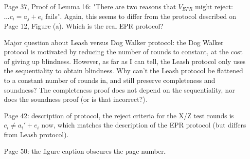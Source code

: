 \documentclass[12pt]{article}
\begin{document}
Page 37, Proof of Lemma 16: "There are two reasons that $V_{EPR}$ might reject: $... c_i = a_j + e_i$ fails". Again, this seems to differ from the protocol described on Page 12, Figure (a). Which is the real EPR protocol?

Major question about Leash versus Dog Walker protocol: the Dog Walker protocol is motivated by reducing the number of rounds to constant, at the cost of giving up blindness. However, as far as I can tell, the Leash protocol only uses the sequentiality to obtain blindness. Why can't the Leash protocol be flattened to a constant number of rounds in, and still preserve completeness and soundness? The completeness proof does not depend on the sequentiality, nor does the soundness proof (or is that incorrect?).

Page 42: description of protocol, the reject criteria for the X/Z test rounds is $c_i \neq a_i' + e_i$ now, which matches the description of the EPR protocol (but differs from Leash protocol).

Page 50: the figure caption obscures the page number.
\end{document}
